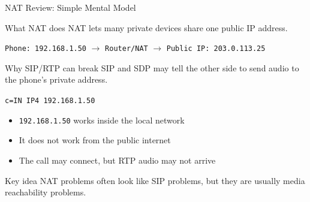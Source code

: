 \documentclass[aspectratio=169]{beamer}
\begin{document}
\begin{frame}{NAT Review: Simple Mental Model}
\small

\begin{block}{What NAT does}
NAT lets many private devices share one public IP address.
\end{block}

\vspace{0.25cm}

\begin{center}
\texttt{Phone: 192.168.1.50}
\quad $\longrightarrow$ \quad
\texttt{Router/NAT}
\quad $\longrightarrow$ \quad
\texttt{Public IP: 203.0.113.25}
\end{center}


\begin{block}{Why SIP/RTP can break}
SIP and SDP may tell the other side to send audio to the phone's private address.
\end{block}

\begin{center}
\texttt{c=IN IP4 192.168.1.50}
\end{center}


\begin{itemize}
    \item \texttt{192.168.1.50} works inside the local network
    \item It does not work from the public internet
    \item The call may connect, but RTP audio may not arrive
\end{itemize}


\begin{alertblock}{Key idea}
NAT problems often look like SIP problems, but they are usually media reachability problems.
\end{alertblock}

\end{frame}
\end{document}
